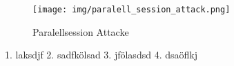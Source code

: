 \documentclass[12pt]{scrartcl}
\begin{document}
\begin{figure}[ht]
    \centering
    \texttt{[image: img/paralell\_session\_attack.png]}
    \caption{Paralellsession Attacke}
    \label{fig:paralell_session_attack}
\end{figure}

1. laksdjf
2. sadfkölsad
3. jfölasdsd
4. dsaöflkj










\end{document}
